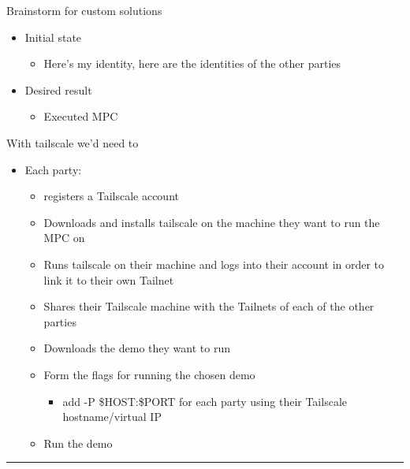 \label{notes__03500-brainstorm.md}
\begin{frame}{Brainstorm for custom solutions}
\label{notes__03500-brainstorm.md__brainstorm-for-custom-solutions}
\begin{itemize}
\tightlist
\item
  Initial state

  \begin{itemize}
  \tightlist
  \item
    Here's my identity, here are the identities of the other parties
  \end{itemize}
\item
  Desired result

  \begin{itemize}
  \tightlist
  \item
    Executed MPC
  \end{itemize}
\end{itemize}

With tailscale we'd need to

\begin{itemize}
\tightlist
\item
  Each party:

  \begin{itemize}
  \tightlist
  \item
    registers a Tailscale account
  \item
    Downloads and installs tailscale on the machine they want to run the MPC on
  \item
    Runs tailscale on their machine and logs into their account in order to link it to their own Tailnet
  \item
    Shares their Tailscale machine with the Tailnets of each of the other parties
  \item
    Downloads the demo they want to run
  \item
    Form the flags for running the chosen demo

    \begin{itemize}
    \tightlist
    \item
      add -P \$HOST:\$PORT for each party using their Tailscale hostname/virtual IP
    \end{itemize}
  \item
    Run the demo
  \end{itemize}
\end{itemize}

\begin{center}\rule{0.5\linewidth}{0.5pt}\end{center}


\end{frame}
